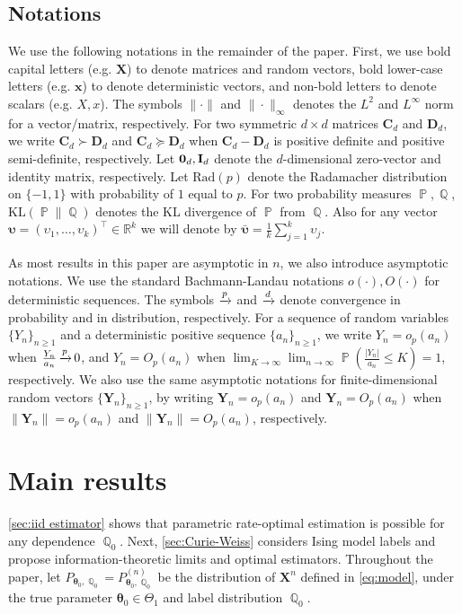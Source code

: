 \documentclass[preprint,reqno]{imsart}
\newcommand{\ttheta}{\boldsymbol{\theta}}
\newcommand{\I}{\mathbf{I}_{\mathnormal{d}}}
\DeclareMathOperator{\xp}{\xrightarrow{\mathnormal p}}
\DeclareMathOperator{\xd}{\xrightarrow{\mathnormal d}}
\DeclareMathOperator{\PP}{\mathbb{P}}
\DeclareMathOperator{\QQ}{\mathbb{Q}}
\newcommand{\X}{\mathbf{X}}
\begin{document}
\subsection{Notations}
We use the following notations in the remainder of the paper. First, we use bold capital letters (e.g. $\X$) to denote matrices and random vectors, bold lower-case letters (e.g. $\mathbf{x}$) to denote deterministic vectors, and non-bold letters to denote scalars (e.g. $X, x$). The symbols 
$\|\cdot \|$ and $ \|\cdot\|_\infty$ denotes the $L^2$ and $L^\infty$ norm for a vector/matrix, respectively. For two symmetric $d\times d$ matrices $\mathbf{C}_d$ and $\mathbf{D}_d$, we write $\mathbf{C}_d \succ \mathbf{D}_d$ and $\mathbf{C}_d \succeq \mathbf{D}_d$ when $\mathbf{C}_d - \mathbf{D}_d$ is positive definite and positive semi-definite, respectively. Let $\mathbf{0}_d, \I$ denote the $d$-dimensional zero-vector and identity matrix, respectively. Let $\text{Rad}(p)$ denote the Radamacher distribution on $\{-1,1\}$ with probability of $1$ equal to $p$. For two probability measures $\PP,\QQ$, $\text{KL}(\PP \| \QQ)$ denotes the KL divergence of $\PP$ from $\QQ$. Also for any vector $\pmb{\upsilon}=(\upsilon_1,\ldots,\upsilon_k)^\top\in \mathbb{R}^k$ we will denote by $\bar{\pmb{\upsilon}}=\frac{1}{k}\sum_{j=1}^k\upsilon_j$.
%

As most results in this paper are asymptotic in $n$, we also introduce asymptotic notations. We use the standard Bachmann-Landau notations $o(\cdot), O(\cdot)$ for deterministic sequences. The symbols $\xp$ and $\xd$ denote convergence in probability and in distribution, respectively.
%
For a sequence of random variables $\{Y_n\}_{n \ge 1}$ and a deterministic positive sequence $\{a_n\}_{n \ge 1}$, we write $Y_n = o_p(a_n)$ when $\frac{Y_n}{a_n} \xp 0$, and $Y_n = O_p(a_n)$ when $\lim_{K \to \infty} \lim_{n \to \infty} \PP(\frac{|Y_n|}{a_n} \le K) = 1$, respectively. We also use the same asymptotic notations for finite-dimensional random vectors $\{\mathbf{Y}_n \}_{n \ge 1}$, by writing $\mathbf{Y}_n = o_p(a_n)$ and $\mathbf{Y}_n = O_p(a_n)$ when $\|\mathbf{Y}_n\| = o_p(a_n)$ and $\|\mathbf{Y}_n\| = O_p(a_n)$, respectively.
%

%
%

%
%

%
%
%
%
%
%
%

\section{Main results}
\cref{sec:iid estimator} shows that parametric rate-optimal estimation is possible for any dependence $\QQ_0$. Next, \cref{sec:Curie-Weiss} considers Ising model labels and propose information-theoretic limits and optimal estimators. Throughout the paper, let $P_{\ttheta_0, \QQ_{0}} = P_{\ttheta_0, \QQ_0}^{(n)}$ be the distribution of $\X^n$ defined in \eqref{eq:model}, under the true parameter $\ttheta_0 \in \Theta_1$ and label distribution $\QQ_{0}$. %
\end{document}
